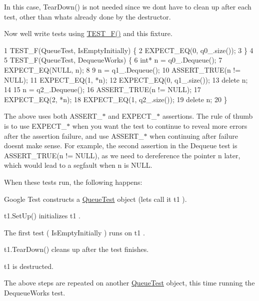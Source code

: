 In this case, {\ttfamily Tear\+Down()} is not needed since we don\textquotesingle{}t have to clean up after each test, other than what\textquotesingle{}s already done by the destructor.

Now we\textquotesingle{}ll write tests using {\ttfamily \hyperlink{gtest_8h_a0ee66d464d1a06c20c1929cae09d8758}{T\+E\+S\+T\+\_\+\+F()}} and this fixture. 
\begin{DoxyCode}
1 TEST\_F(QueueTest, IsEmptyInitially) \{
2   EXPECT\_EQ(0, q0\_.size());
3 \}
4 
5 TEST\_F(QueueTest, DequeueWorks) \{
6   int* n = q0\_.Dequeue();
7   EXPECT\_EQ(NULL, n);
8 
9   n = q1\_.Dequeue();
10   ASSERT\_TRUE(n != NULL);
11   EXPECT\_EQ(1, *n);
12   EXPECT\_EQ(0, q1\_.size());
13   delete n;
14 
15   n = q2\_.Dequeue();
16   ASSERT\_TRUE(n != NULL);
17   EXPECT\_EQ(2, *n);
18   EXPECT\_EQ(1, q2\_.size());
19   delete n;
20 \}
\end{DoxyCode}


The above uses both {\ttfamily A\+S\+S\+E\+R\+T\+\_\+$\ast$} and {\ttfamily E\+X\+P\+E\+C\+T\+\_\+$\ast$} assertions. The rule of thumb is to use {\ttfamily E\+X\+P\+E\+C\+T\+\_\+$\ast$} when you want the test to continue to reveal more errors after the assertion failure, and use {\ttfamily A\+S\+S\+E\+R\+T\+\_\+$\ast$} when continuing after failure doesn\textquotesingle{}t make sense. For example, the second assertion in the {\ttfamily Dequeue} test is {\ttfamily A\+S\+S\+E\+R\+T\+\_\+\+T\+R\+UE(n != N\+U\+LL)}, as we need to dereference the pointer {\ttfamily n} later, which would lead to a segfault when {\ttfamily n} is {\ttfamily N\+U\+LL}.

When these tests run, the following happens\+:
\begin{DoxyEnumerate}
\item Google Test constructs a {\ttfamily \hyperlink{class_queue_test}{Queue\+Test}} object (let\textquotesingle{}s call it {\ttfamily t1} ).
\end{DoxyEnumerate}
\begin{DoxyEnumerate}
\item {\ttfamily t1.\+Set\+Up()} initializes {\ttfamily t1} .
\end{DoxyEnumerate}
\begin{DoxyEnumerate}
\item The first test ( {\ttfamily Is\+Empty\+Initially} ) runs on {\ttfamily t1} .
\end{DoxyEnumerate}
\begin{DoxyEnumerate}
\item {\ttfamily t1.\+Tear\+Down()} cleans up after the test finishes.
\end{DoxyEnumerate}
\begin{DoxyEnumerate}
\item {\ttfamily t1} is destructed.
\end{DoxyEnumerate}
\begin{DoxyEnumerate}
\item The above steps are repeated on another {\ttfamily \hyperlink{class_queue_test}{Queue\+Test}} object, this time running the {\ttfamily Dequeue\+Works} test.
\end{DoxyEnumerate}


